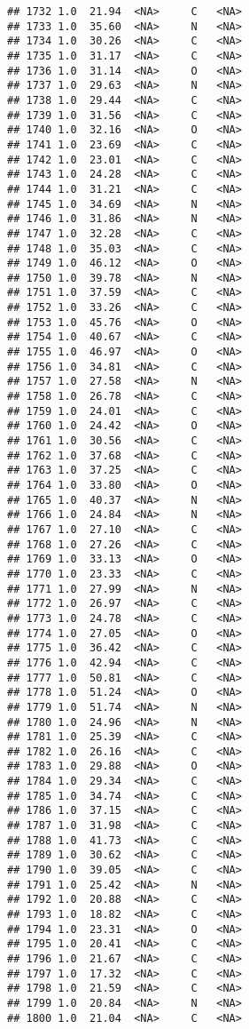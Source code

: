 \documentclass[
]{article}
\begin{document}
\begin{verbatim}
## 1732 1.0  21.94  <NA>     C   <NA>
## 1733 1.0  35.60  <NA>     N   <NA>
## 1734 1.0  30.26  <NA>     C   <NA>
## 1735 1.0  31.17  <NA>     C   <NA>
## 1736 1.0  31.14  <NA>     O   <NA>
## 1737 1.0  29.63  <NA>     N   <NA>
## 1738 1.0  29.44  <NA>     C   <NA>
## 1739 1.0  31.56  <NA>     C   <NA>
## 1740 1.0  32.16  <NA>     O   <NA>
## 1741 1.0  23.69  <NA>     C   <NA>
## 1742 1.0  23.01  <NA>     C   <NA>
## 1743 1.0  24.28  <NA>     C   <NA>
## 1744 1.0  31.21  <NA>     C   <NA>
## 1745 1.0  34.69  <NA>     N   <NA>
## 1746 1.0  31.86  <NA>     N   <NA>
## 1747 1.0  32.28  <NA>     C   <NA>
## 1748 1.0  35.03  <NA>     C   <NA>
## 1749 1.0  46.12  <NA>     O   <NA>
## 1750 1.0  39.78  <NA>     N   <NA>
## 1751 1.0  37.59  <NA>     C   <NA>
## 1752 1.0  33.26  <NA>     C   <NA>
## 1753 1.0  45.76  <NA>     O   <NA>
## 1754 1.0  40.67  <NA>     C   <NA>
## 1755 1.0  46.97  <NA>     O   <NA>
## 1756 1.0  34.81  <NA>     C   <NA>
## 1757 1.0  27.58  <NA>     N   <NA>
## 1758 1.0  26.78  <NA>     C   <NA>
## 1759 1.0  24.01  <NA>     C   <NA>
## 1760 1.0  24.42  <NA>     O   <NA>
## 1761 1.0  30.56  <NA>     C   <NA>
## 1762 1.0  37.68  <NA>     C   <NA>
## 1763 1.0  37.25  <NA>     C   <NA>
## 1764 1.0  33.80  <NA>     O   <NA>
## 1765 1.0  40.37  <NA>     N   <NA>
## 1766 1.0  24.84  <NA>     N   <NA>
## 1767 1.0  27.10  <NA>     C   <NA>
## 1768 1.0  27.26  <NA>     C   <NA>
## 1769 1.0  33.13  <NA>     O   <NA>
## 1770 1.0  23.33  <NA>     C   <NA>
## 1771 1.0  27.99  <NA>     N   <NA>
## 1772 1.0  26.97  <NA>     C   <NA>
## 1773 1.0  24.78  <NA>     C   <NA>
## 1774 1.0  27.05  <NA>     O   <NA>
## 1775 1.0  36.42  <NA>     C   <NA>
## 1776 1.0  42.94  <NA>     C   <NA>
## 1777 1.0  50.81  <NA>     C   <NA>
## 1778 1.0  51.24  <NA>     O   <NA>
## 1779 1.0  51.74  <NA>     N   <NA>
## 1780 1.0  24.96  <NA>     N   <NA>
## 1781 1.0  25.39  <NA>     C   <NA>
## 1782 1.0  26.16  <NA>     C   <NA>
## 1783 1.0  29.88  <NA>     O   <NA>
## 1784 1.0  29.34  <NA>     C   <NA>
## 1785 1.0  34.74  <NA>     C   <NA>
## 1786 1.0  37.15  <NA>     C   <NA>
## 1787 1.0  31.98  <NA>     C   <NA>
## 1788 1.0  41.73  <NA>     C   <NA>
## 1789 1.0  30.62  <NA>     C   <NA>
## 1790 1.0  39.05  <NA>     C   <NA>
## 1791 1.0  25.42  <NA>     N   <NA>
## 1792 1.0  20.88  <NA>     C   <NA>
## 1793 1.0  18.82  <NA>     C   <NA>
## 1794 1.0  23.31  <NA>     O   <NA>
## 1795 1.0  20.41  <NA>     C   <NA>
## 1796 1.0  21.67  <NA>     C   <NA>
## 1797 1.0  17.32  <NA>     C   <NA>
## 1798 1.0  21.59  <NA>     C   <NA>
## 1799 1.0  20.84  <NA>     N   <NA>
## 1800 1.0  21.04  <NA>     C   <NA>

\end{verbatim}
\end{document}
